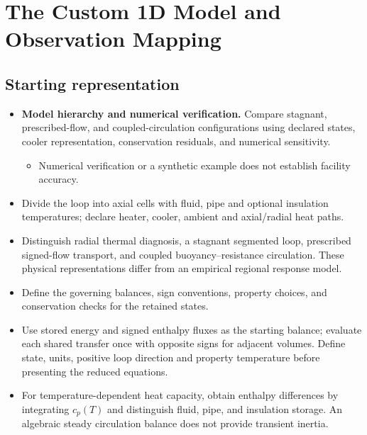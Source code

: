 \section{The Custom 1D Model and Observation Mapping}\label{sec:the-custom-1d-model-and-observation-mapping}

\subsection{Starting representation}\label{subsec:starting-representation}

\begin{itemize}[leftmargin=*]
\item {}\textbf{Model hierarchy and numerical verification.} Compare stagnant, prescribed-flow, and coupled-circulation configurations using declared states, cooler representation, conservation residuals, and numerical sensitivity.
\begin{itemize}
\item Numerical verification or a synthetic example does not establish facility accuracy.
\end{itemize}

\item Divide the loop into axial cells with fluid, pipe and optional insulation temperatures; declare heater, cooler, ambient and axial/\allowbreak{}radial heat paths.
\item Distinguish radial thermal diagnosis, a stagnant segmented loop, prescribed signed-flow transport, and coupled buoyancy--resistance circulation. These physical representations differ from an empirical regional response model.
\item Define the governing balances, sign conventions, property choices, and conservation checks for the retained states.
\item Use stored energy and signed enthalpy fluxes as the starting balance; evaluate each shared transfer once with opposite signs for adjacent volumes. Define state, units, positive loop direction and property temperature before presenting the reduced equations.
\item For temperature-dependent heat capacity, obtain enthalpy differences by integrating $c_p(T)$ and distinguish fluid, pipe, and insulation storage. An algebraic steady circulation balance does not provide transient inertia.


\end{itemize}
